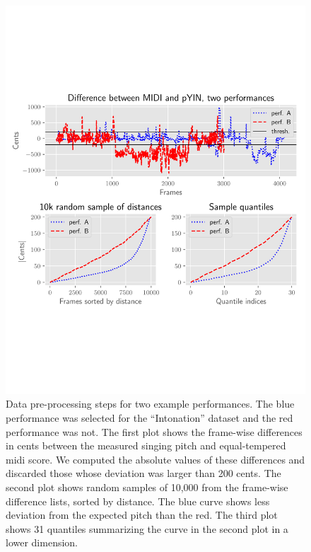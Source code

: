 \begin{figure}[h!]
    \centering
    \includegraphics[width=\textwidth]{figures/data_processing_pipeline.pdf}\vspace{-1in}
    \caption{Data pre-processing steps for two example performances. The blue performance was selected for the ``Intonation'' dataset and the red performance was not. The first plot shows the frame-wise differences in cents between the measured singing pitch and equal-tempered \gls{midi} score. We computed the absolute values of these differences and discarded those whose deviation was larger than 200 cents. The second plot shows random samples of 10,000 from the frame-wise difference lists, sorted by distance. The blue curve shows less deviation from the expected pitch than the red. The third plot shows 31 quantiles summarizing the curve in the second plot in a lower dimension.}
    \label{fig:pipeline}
\end{figure}
